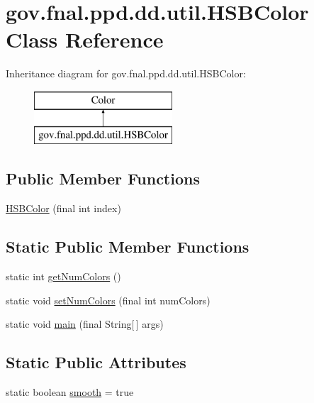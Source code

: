 \hypertarget{classgov_1_1fnal_1_1ppd_1_1dd_1_1util_1_1HSBColor}{\section{gov.\-fnal.\-ppd.\-dd.\-util.\-H\-S\-B\-Color Class Reference}
\label{classgov_1_1fnal_1_1ppd_1_1dd_1_1util_1_1HSBColor}
}
Inheritance diagram for gov.\-fnal.\-ppd.\-dd.\-util.\-H\-S\-B\-Color\-:\begin{figure}[H]
\begin{center}
\leavevmode
\includegraphics[height=2.000000cm]{classgov_1_1fnal_1_1ppd_1_1dd_1_1util_1_1HSBColor}
\end{center}
\end{figure}
\subsection*{Public Member Functions}
\begin{DoxyCompactItemize}
\item 
\hyperlink{classgov_1_1fnal_1_1ppd_1_1dd_1_1util_1_1HSBColor_a59b076fbf401ee955f17345a3103127d}{H\-S\-B\-Color} (final int index)
\end{DoxyCompactItemize}
\subsection*{Static Public Member Functions}
\begin{DoxyCompactItemize}
\item 
static int \hyperlink{classgov_1_1fnal_1_1ppd_1_1dd_1_1util_1_1HSBColor_a4c6c8a359ac098b662e6eab3eb41aec0}{get\-Num\-Colors} ()
\item 
static void \hyperlink{classgov_1_1fnal_1_1ppd_1_1dd_1_1util_1_1HSBColor_a0e7a3f7199badf48504348d98862f5d9}{set\-Num\-Colors} (final int num\-Colors)
\item 
static void \hyperlink{classgov_1_1fnal_1_1ppd_1_1dd_1_1util_1_1HSBColor_a5b2ad0bcf7b8dacb2808bf553752fec6}{main} (final String\mbox{[}$\,$\mbox{]} args)
\end{DoxyCompactItemize}
\subsection*{Static Public Attributes}
\begin{DoxyCompactItemize}
\item 
static boolean \hyperlink{classgov_1_1fnal_1_1ppd_1_1dd_1_1util_1_1HSBColor_a89646664ade8a7ef3abab67b3fd0dcbc}{smooth} = true
\end{DoxyCompactItemize}


